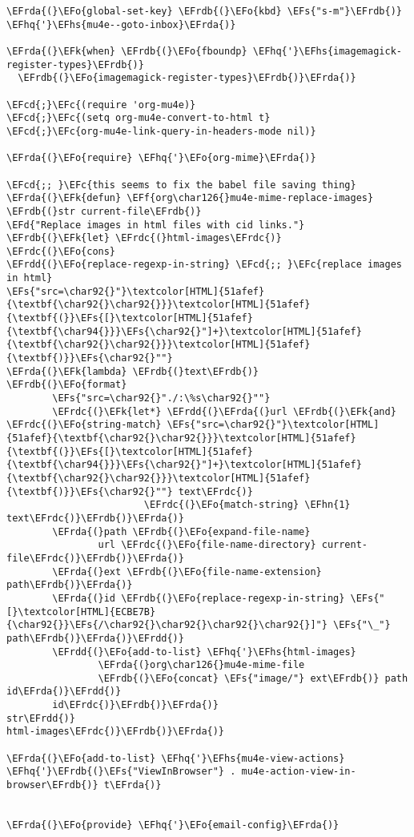 \documentclass[a4wide,10pt]{article}
\newcommand{\EFc}[1]{\textcolor{EFc}{#1}} %
\newcommand{\EFcd}[1]{\textcolor{EFcd}{#1}} %
\newcommand{\EFs}[1]{\textcolor{EFs}{#1}} %
\newcommand{\EFd}[1]{\textcolor{EFd}{#1}} %
\newcommand{\EFk}[1]{\textcolor{EFk}{#1}} %
\newcommand{\EFf}[1]{\textcolor{EFf}{#1}} %
\newcommand{\EFo}[1]{\textcolor{EFo}{#1}} %
\newcommand{\EFhn}[1]{\textcolor{EFhn}{\textbf{#1}}} %
\newcommand{\EFhq}[1]{\textcolor{EFhq}{#1}} %
\newcommand{\EFhs}[1]{\textcolor{EFhs}{#1}} %
\newcommand{\EFrda}[1]{\textcolor{EFrda}{#1}} %
\newcommand{\EFrdb}[1]{\textcolor{EFrdb}{#1}} %
\newcommand{\EFrdc}[1]{\textcolor{EFrdc}{#1}} %
\newcommand{\EFrdd}[1]{\textcolor{EFrdd}{#1}} %
\begin{document}
\begin{Code}
\begin{Verbatim}
\EFrda{(}\EFo{global-set-key} \EFrdb{(}\EFo{kbd} \EFs{"s-m"}\EFrdb{)} \EFhq{'}\EFhs{mu4e--goto-inbox}\EFrda{)}

\EFrda{(}\EFk{when} \EFrdb{(}\EFo{fboundp} \EFhq{'}\EFhs{imagemagick-register-types}\EFrdb{)}
  \EFrdb{(}\EFo{imagemagick-register-types}\EFrdb{)}\EFrda{)}

\EFcd{;}\EFc{(require 'org-mu4e)}
\EFcd{;}\EFc{(setq org-mu4e-convert-to-html t}
\EFcd{;}\EFc{org-mu4e-link-query-in-headers-mode nil)}

\EFrda{(}\EFo{require} \EFhq{'}\EFo{org-mime}\EFrda{)}

\EFcd{;; }\EFc{this seems to fix the babel file saving thing}
\EFrda{(}\EFk{defun} \EFf{org\char126{}mu4e-mime-replace-images} \EFrdb{(}str current-file\EFrdb{)}
\EFd{"Replace images in html files with cid links."}
\EFrdb{(}\EFk{let} \EFrdc{(}html-images\EFrdc{)}
\EFrdc{(}\EFo{cons}
\EFrdd{(}\EFo{replace-regexp-in-string} \EFcd{;; }\EFc{replace images in html}
\EFs{"src=\char92{}"}\textcolor[HTML]{51afef}{\textbf{\char92{}\char92{}}}\textcolor[HTML]{51afef}{\textbf{(}}\EFs{[}\textcolor[HTML]{51afef}{\textbf{\char94{}}}\EFs{\char92{}"]+}\textcolor[HTML]{51afef}{\textbf{\char92{}\char92{}}}\textcolor[HTML]{51afef}{\textbf{)}}\EFs{\char92{}""}
\EFrda{(}\EFk{lambda} \EFrdb{(}text\EFrdb{)}
\EFrdb{(}\EFo{format}
        \EFs{"src=\char92{}"./:\%s\char92{}""}
        \EFrdc{(}\EFk{let*} \EFrdd{(}\EFrda{(}url \EFrdb{(}\EFk{and} \EFrdc{(}\EFo{string-match} \EFs{"src=\char92{}"}\textcolor[HTML]{51afef}{\textbf{\char92{}\char92{}}}\textcolor[HTML]{51afef}{\textbf{(}}\EFs{[}\textcolor[HTML]{51afef}{\textbf{\char94{}}}\EFs{\char92{}"]+}\textcolor[HTML]{51afef}{\textbf{\char92{}\char92{}}}\textcolor[HTML]{51afef}{\textbf{)}}\EFs{\char92{}""} text\EFrdc{)}
                        \EFrdc{(}\EFo{match-string} \EFhn{1} text\EFrdc{)}\EFrdb{)}\EFrda{)}
        \EFrda{(}path \EFrdb{(}\EFo{expand-file-name}
                url \EFrdc{(}\EFo{file-name-directory} current-file\EFrdc{)}\EFrdb{)}\EFrda{)}
        \EFrda{(}ext \EFrdb{(}\EFo{file-name-extension} path\EFrdb{)}\EFrda{)}
        \EFrda{(}id \EFrdb{(}\EFo{replace-regexp-in-string} \EFs{"[}\textcolor[HTML]{ECBE7B}{\char92{}}\EFs{/\char92{}\char92{}\char92{}\char92{}]"} \EFs{"\_"} path\EFrdb{)}\EFrda{)}\EFrdd{)}
        \EFrdd{(}\EFo{add-to-list} \EFhq{'}\EFhs{html-images}
                \EFrda{(}org\char126{}mu4e-mime-file
                \EFrdb{(}\EFo{concat} \EFs{"image/"} ext\EFrdb{)} path id\EFrda{)}\EFrdd{)}
        id\EFrdc{)}\EFrdb{)}\EFrda{)}
str\EFrdd{)}
html-images\EFrdc{)}\EFrdb{)}\EFrda{)}

\EFrda{(}\EFo{add-to-list} \EFhq{'}\EFhs{mu4e-view-actions}
\EFhq{'}\EFrdb{(}\EFs{"ViewInBrowser"} . mu4e-action-view-in-browser\EFrdb{)} t\EFrda{)}


\EFrda{(}\EFo{provide} \EFhq{'}\EFo{email-config}\EFrda{)}
\end{Verbatim}
\end{Code}
\end{document}
